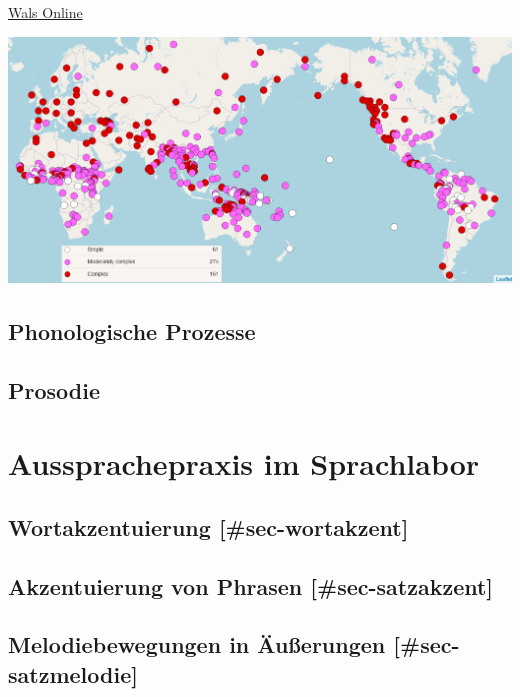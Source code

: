 \documentclass[
  letterpaper,
]{scrbook}
\begin{document}
\href{https://wals.info/}{Wals Online}

\includegraphics[width=1\textwidth,height=\textheight]{./pictures/01b_NSG_Intro_2020-10-07/wals_syllable_structure.png}

\hypertarget{phonologische-prozesse}{%
\chapter{Phonologische Prozesse}\label{phonologische-prozesse}}

\hypertarget{prosodie-1}{%
\chapter{Prosodie}\label{prosodie-1}}

\part{Aussprachepraxis im Sprachlabor}

\hypertarget{wortakzentuierung-sec-wortakzent}{%
\chapter{Wortakzentuierung
{[}\#sec-wortakzent{]}}\label{wortakzentuierung-sec-wortakzent}}

\hypertarget{akzentuierung-von-phrasen-sec-satzakzent}{%
\chapter{Akzentuierung von Phrasen
{[}\#sec-satzakzent{]}}\label{akzentuierung-von-phrasen-sec-satzakzent}}

\hypertarget{melodiebewegungen-in-uxe4uuxdferungen-sec-satzmelodie}{%
\chapter{Melodiebewegungen in Äußerungen
{[}\#sec-satzmelodie{]}}\label{melodiebewegungen-in-uxe4uuxdferungen-sec-satzmelodie}}
\end{document}
